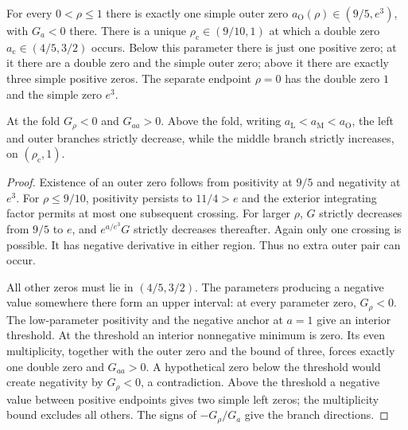 \begin{theorem}\label{globalphase:theorem}
For every $0<\rho\leq1$ there is exactly one simple outer zero
$a_{\mathrm O}(\rho)\in(9/5,e^3)$, with $G_a<0$ there. There is a unique
$\rho_{\mathrm c}\in(9/10,1)$ at which a double zero
$a_{\mathrm c}\in(4/5,3/2)$ occurs. Below this parameter there is just one
positive zero; at it there are a double zero and the simple outer zero;
above it there are exactly three simple positive zeros. The separate
endpoint $\rho=0$ has the double zero $1$ and the simple zero $e^3$.

At the fold $G_\rho<0$ and $G_{aa}>0$. Above the fold, writing
$a_{\mathrm L}<a_{\mathrm M}<a_{\mathrm O}$, the left and outer branches
strictly decrease, while the middle branch strictly increases, on
$(\rho_{\mathrm c},1)$.
\end{theorem}
\begin{proof}
Existence of an outer zero follows from positivity at $9/5$ and negativity
at $e^3$. For $\rho\leq9/10$, positivity persists to $11/4>e$ and the
exterior integrating factor permits at most one subsequent crossing.
For larger $\rho$, $G$ strictly decreases from $9/5$ to $e$, and
$e^{a/e^3}G$ strictly decreases thereafter. Again only one crossing is
possible. It has negative derivative in either region. Thus no extra
outer pair can occur.

All other zeros must lie in $(4/5,3/2)$. The parameters producing a negative
value somewhere there form an upper interval: at every parameter zero,
$G_\rho<0$. The low-parameter positivity and the negative anchor at $a=1$
give an interior threshold. At the threshold an interior nonnegative
minimum is zero. Its even multiplicity, together with the outer zero and
the bound of three, forces exactly one double zero and $G_{aa}>0$.
A hypothetical zero below the threshold would create negativity by
$G_\rho<0$, a contradiction. Above the threshold a negative value between
positive endpoints gives two simple left zeros; the multiplicity bound
excludes all others. The signs of $-G_\rho/G_a$ give the branch directions.
\end{proof}

